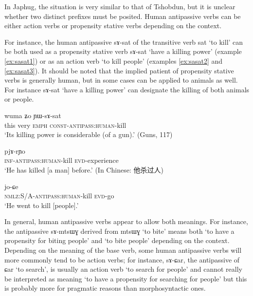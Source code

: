 \documentclass[oldfontcommands,oneside,a4paper,11pt]{article}
\newcommand{\ipa}[1]{{\phon \mbox{#1}}} %
\newcommand{\zh}[1]{{\cn #1}}
\begin{document}
In Japhug, the situation is very similar to that of Tshobdun, but it is unclear whether two distinct prefixes must be posited. Human antipassive verbs can be either action verbs or propensity stative verbs depending on the context.

For instance, the human antipassive \ipa{sɤ-sat} of the transitive verb \ipa{sat} `to kill' can be both used as a propensity stative verb  \ipa{sɤ-sat} `have a killing power' (example \ref{ex:sasat1}) or as an action verb `to kill people' (examples \ref{ex:sasat2} and \ref{ex:sasat3}). It should be noted that the implied patient of   propensity stative verbs is generally human, but in some cases can be applied to animals as well. For instance   \ipa{sɤ-sat}  `have a killing power' can designate the killing of both animals or   people.

    \begin{exe} 
\ex \label{ex:sasat1}
\gll  \ipa{nɯnɯ} \ipa{wuma} \ipa{ʑo} \ipa{ɲɯ-sɤ-sat}  \\
  this very \textsc{emph} \textsc{const-antipass:human}-kill \\
 \glt   `Its killing power is considerable (of a gun).' (Guns, 117)
\end{exe}    
 
     \begin{exe} 
\ex \label{ex:sasat2}
\gll  \ipa{kɤ-sɤ-sat}  \ipa{pjɤ-rɲo}\\
   \textsc{inf-antipass:human}-kill \textsc{evd}-experience \\
 \glt  `He has killed [a man] before.' (In Chinese: \zh{他杀过人})
 \end{exe}
      \begin{exe} 
 \ex \label{ex:sasat3}
\gll  \ipa{kɯ-sɤ-sat}  \ipa{jo-ɕe}\\
   \textsc{nmlz:S/A-antipass:human}-kill \textsc{evd}-go \\
 \glt  `He went to kill [people].'
\end{exe} 

In general, human antipassive verbs appear to allow both meanings. For instance, the antipassive \ipa{sɤ-mtsɯɣ} derived from \ipa{mtsɯɣ} `to bite' means both `to have a propensity for biting people' and `to bite people' depending on the context. Depending on the meaning of the base verb, some human antipassive verbs will more commonly tend to be  action verbs; for instance, \ipa{sɤ-ɕar}, the antipassive of \ipa{ɕar} `to search', is usually an action verb `to search for people' and cannot really be interpreted as meaning `to have a propensity for searching for people' but this is probably more for pragmatic reasons than morphosyntactic ones.  
\end{document}
